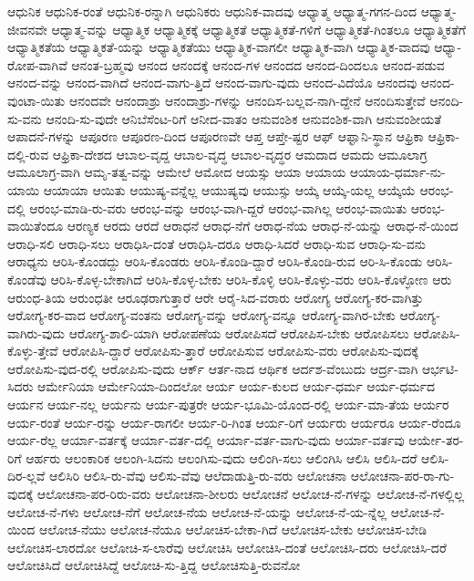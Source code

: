 {ಆಧುನಿಕ
ಆಧುನಿಕ-ರಂತೆ
ಆಧುನಿಕ-ರನ್ನಾಗಿ
ಆಧುನಿಕರು
ಆಧುನಿಕ-ವಾದವು
ಆಧ್ಯಾತ್ಮ
ಆಧ್ಯಾತ್ಮ-ಗಗನ-ದಿಂದ
ಆಧ್ಯಾತ್ಮ-ಜೀವನವೇ
ಆಧ್ಯಾತ್ಮ-ವನ್ನು
ಆಧ್ಯಾತ್ಮಿಕ
ಆಧ್ಯಾತ್ಮಿಕಕ್ಕೆ
ಆಧ್ಯಾತ್ಮಿಕತೆ
ಆಧ್ಯಾತ್ಮಿಕತೆ-ಗಳಿಗೆ
ಆಧ್ಯಾತ್ಮಿಕತೆ-ಗಿಂತಲೂ
ಆಧ್ಯಾತ್ಮಿಕತೆಗೆ
ಆಧ್ಯಾತ್ಮಿಕತೆಯ
ಆಧ್ಯಾತ್ಮಿಕತೆ-ಯನ್ನು
ಆಧ್ಯಾತ್ಮಿಕತೆಯು
ಆಧ್ಯಾತ್ಮಿಕ-ವಾಗಲೀ
ಆಧ್ಯಾತ್ಮಿಕ-ವಾಗಿ
ಆಧ್ಯಾತ್ಮಿಕ-ವಾದವು
ಆಧ್ಯಾ-ರೋಪ-ವಾಗಿವೆ
ಆನಂತ-ಬ್ರಹ್ಮವು
ಆನಂದ
ಆನಂದಕ್ಕೆ
ಆನಂದ-ಗಳ
ಆನಂದದ
ಆನಂದ-ದಿಂದಲೂ
ಆನಂದ-ಪಡುವ
ಆನಂದ-ವನ್ನು
ಆನಂದ-ವಾಗಿದೆ
ಆನಂದ-ವಾಗು-ತ್ತಿದೆ
ಆನಂದ-ವಾಗು-ವುದು
ಆನಂದ-ವಿದೆಯೊ
ಆನಂದವು
ಆನಂದ-ವುಂಟಾ-ಯಿತು
ಆನಂದವೇ
ಆನಂದಾಶ್ರು
ಆನಂದಾಶ್ರು-ಗಳನ್ನು
ಆನಂದಿಸ-ಬಲ್ಲವ-ನಾಗಿ-ದ್ದೇನೆ
ಆನಂದಿಸುತ್ತೇವೆ
ಆನಂದಿ-ಸು-ವನು
ಆನಂದಿ-ಸು-ವುದೇ
ಆನಿಬೆಸೆಂಟ-ರಿಗೆ
ಆನೀದ-ವಾತಂ
ಆನುವಂಶಿಕ
ಆನುವಂಶಿಕ-ವಾಗಿ
ಆನುವಂಶೀಯತೆ
ಆಪಾದನೆ-ಗಳನ್ನು
ಆಪೂರಣ
ಆಪೂರಣ-ದಿಂದ
ಆಪೂರಣವೇ
ಆಪ್ತ
ಆಪ್ತೇ-ಷ್ಟರ
ಆಫ್
ಆಫ್ಘಾನಿ-ಸ್ಥಾನ
ಆಫ್ರಿಕಾ
ಆಫ್ರಿಕಾ-ದಲ್ಲಿ-ರುವ
ಆಫ್ರಿಕಾ-ದೇಶದ
ಆಬಾಲ-ವೃದ್ದ
ಆಬಾಲ-ವೃದ್ಧ
ಆಬಾಲ-ವೃದ್ಧರ
ಆಮದಾದ
ಆಮದು
ಆಮೂಲಾಗ್ರ
ಆಮೂಲಾಗ್ರ-ವಾಗಿ
ಆಮೃ-ತತ್ವ-ವನ್ನು
ಆಮೇಲೆ
ಆಮೋದ
ಆಯಸ್ಸು
ಆಯಾ
ಆಯಾಯ
ಆಯಾಯ-ಧರ್ಮಾ-ನು-ಯಾಯಿ
ಆಯಾಯಾ
ಆಯಿತು
ಆಯುಷ್ಯ-ವನ್ನೆಲ್ಲ
ಆಯುಷ್ಯವು
ಆಯುಸ್ಸು
ಆಯ್ಕೆ
ಆಯ್ಕೆ-ಯಲ್ಲ
ಆಯ್ಕೆಯೆ
ಆರಂಭ-ದಲ್ಲಿ
ಆರಂಭ-ಮಾಡಿ-ರು-ವರು
ಆರಂಭ-ವನ್ನು
ಆರಂಭ-ವಾಗಿ-ದ್ದರೆ
ಆರಂಭ-ವಾಗಿಲ್ಲ
ಆರಂಭ-ವಾಯಿತು
ಆರಂಭ-ವಾಯಿತೆಂದೂ
ಆರಣ್ಯಕ
ಆರದು
ಆರದೆ
ಆರಾಧನೆ
ಆರಾಧ-ನೆಗೆ
ಆರಾಧ-ನೆಯ
ಆರಾಧ-ನೆ-ಯನ್ನು
ಆರಾಧ-ನೆ-ಯಿಂದ
ಆರಾಧಿ-ಸಲಿ
ಆರಾಧಿ-ಸಲು
ಆರಾಧಿಸಿ-ದಂತೆ
ಆರಾಧಿಸಿ-ದರೂ
ಆರಾಧಿ-ಸಿದರೆ
ಆರಾಧಿ-ಸುವ
ಆರಾಧಿ-ಸು-ವನು
ಆರಾಧ್ಯನು
ಆರಿಸಿ-ಕೊಂಡದ್ದು
ಆರಿಸಿ-ಕೊಂಡರು
ಆರಿಸಿ-ಕೊಂಡಿ-ದ್ದಾರೆ
ಆರಿಸಿ-ಕೊಂಡಿ-ರುವ
ಆರಿ-ಸಿ-ಕೊಂಡು
ಆರಿಸಿ-ಕೊಂಡೆವು
ಆರಿಸಿ-ಕೊಳ್ಳ-ಬೇಕಾಗಿದೆ
ಆರಿಸಿ-ಕೊಳ್ಳ-ಬೇಕು
ಆರಿಸಿ-ಕೊಳ್ಳಿ
ಆರಿಸಿ-ಕೊಳ್ಳು-ವರು
ಆರಿಸಿ-ಕೊಳ್ಳೋಣ
ಆರು
ಆರುಂಧ-ತಿಯ
ಆರುಂಧತೀ
ಆರೂಢರಾಗುತ್ತಾರೆ
ಆರೇ
ಆರೈ-ಸಿದ-ವರಾರು
ಆರೋಗ್ಯ
ಆರೋಗ್ಯ-ಕರ-ವಾಗಿತ್ತು
ಆರೋಗ್ಯ-ಕರ-ವಾದ
ಆರೋಗ್ಯ-ವಂತನು
ಆರೋಗ್ಯ-ವನ್ನು
ಆರೋಗ್ಯ-ವನ್ನೂ
ಆರೋಗ್ಯ-ವಾಗಿರ-ಬೇಕು
ಆರೋಗ್ಯ-ವಾಗಿರು-ವುದು
ಆರೋಗ್ಯ-ಶಾಲಿ-ಯಾಗಿ
ಆರೋಪಣೆಯ
ಆರೋಪಿಸದೆ
ಆರೋಪಿಸ-ಬೇಕು
ಆರೋಪಿಸಲು
ಆರೋಪಿಸಿ-ಕೊಳ್ಳು-ತ್ತೇವೆ
ಆರೋಪಿಸಿ-ದ್ದಾರೆ
ಆರೋಪಿಸು-ತ್ತಾರೆ
ಆರೋಪಿಸುವ
ಆರೋಪಿಸು-ವರು
ಆರೋಪಿಸು-ವುದಕ್ಕೆ
ಆರೋಪಿಸು-ವುದ-ರಲ್ಲಿ
ಆರೋಪಿಸು-ವುದು
ಆರ್ಕ್
ಆರ್ತ-ನಾದ
ಆರ್ಥಿಕ
ಆರ್ದಶ-ವೆಂಬುದು
ಆರ್ದ್ರ-ವಾಗಿ
ಆರ್ಭಟಿ-ಸಿದರು
ಆರ್ಮೇನಿಯಾ
ಆರ್ಮೇನಿಯಾ-ದಿಂದಲೋ
ಆರ್ಯ
ಆರ್ಯ-ಕುಲದ
ಆರ್ಯ-ಧರ್ಮ
ಆರ್ಯ-ಧರ್ಮದ
ಆರ್ಯನ
ಆರ್ಯ-ನಲ್ಲ
ಆರ್ಯನು
ಆರ್ಯ-ಪುತ್ರರೇ
ಆರ್ಯ-ಭೂಮಿ-ಯೊಂದ-ರಲ್ಲಿ
ಆರ್ಯ-ಮಾ-ತೆಯ
ಆರ್ಯರ
ಆರ್ಯ-ರಂತೆ
ಆರ್ಯ-ರನ್ನು
ಆರ್ಯ-ರಾಗಲೀ
ಆರ್ಯ-ರಿ-ಗಿಂತ
ಆರ್ಯ-ರಿಗೆ
ಆರ್ಯರು
ಆರ್ಯರೂ
ಆರ್ಯ-ರೆಂದೂ
ಆರ್ಯ-ರೆಲ್ಲ
ಆರ್ಯಾ-ವರ್ತಕ್ಕೆ
ಆರ್ಯಾ-ವರ್ತ-ದಲ್ಲಿ
ಆರ್ಯಾ-ವರ್ತ-ವಾಗು-ವುದು
ಆರ್ಯಾ-ವರ್ತವು
ಆರ್ಯೇ-ತರ-ರಿಗೆ
ಆರ್ಹರು
ಆಲಂಕಾರಿಕ
ಆಲಂಗಿ-ಸಿದನು
ಆಲಂಗಿಸು-ವುದು
ಆಲಿಂಗಿ-ಸಲು
ಆಲಿಂಗಿಸಿ
ಆಲಿಸಿ
ಆಲಿಸಿ-ದರೆ
ಆಲಿಸಿ-ದಿರ-ಲ್ಲವೆ
ಆಲಿಸಿರಿ
ಆಲಿಸಿ-ರು-ವೆವು
ಆಲಿಸು-ವೆವು
ಆಲೆದಾಡುತ್ತಿ-ರು-ವರು
ಆಲೋಚನಾ
ಆಲೋಚನಾ-ಪರ-ರಾ-ಗು-ವುದಕ್ಕೆ
ಆಲೋಚನಾ-ಪರ-ರಿರು-ವರು
ಆಲೋಚನಾ-ಶೀಲರು
ಆಲೋಚನೆ
ಆಲೋಚ-ನೆ-ಗಳನ್ನು
ಆಲೋಚ-ನೆ-ಗಳಲ್ಲಿಲ್ಲ
ಆಲೋಚ-ನೆ-ಗಳು
ಆಲೋಚ-ನೆಗೆ
ಆಲೋಚ-ನೆಯ
ಆಲೋಚ-ನೆ-ಯನ್ನು
ಆಲೋಚ-ನೆ-ಯ-ನ್ನೆಲ್ಲ
ಆಲೋಚ-ನೆ-ಯಿಂದ
ಆಲೋಚ-ನೆಯು
ಆಲೋಚ-ನೆಯೂ
ಆಲೋಚಿಸ-ಬೇಕಾ-ಗಿದೆ
ಆಲೋಚಿಸ-ಬೇಕು
ಆಲೋಚಿಸ-ಬೇಡಿ
ಆಲೋಚಿಸ-ಲಾರದೋ
ಆಲೋಚಿ-ಸ-ಲಾರೆವು
ಆಲೋಚಿಸಿ
ಆಲೋಚಿಸಿ-ದಂತೆ
ಆಲೋಚಿಸಿ-ದರು
ಆಲೋಚಿಸಿ-ದರೆ
ಆಲೋಚಿಸಿದೆ
ಆಲೋಚಿಸಿದ್ದೆ
ಆಲೋಚಿ-ಸು-ತ್ತಿದ್ದ
ಆಲೋಚಿಸುತ್ತಿ-ರುವನೋ
}
